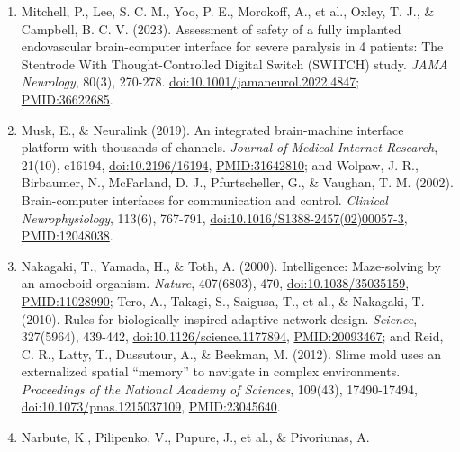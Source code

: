 \documentclass[10pt,letterpaper]{article}
\begin{document}
\begin{enumerate}
  \emph{Annual Review of Microbiology}, 55, 165-199,
  \href{https://doi.org/10.1146/annurev.micro.55.1.165}{doi:10.1146/annurev.micro.55.1.165},
  \url{PMID:11544353}; and Schuster, M., Lostroh, C. P., Ogi, T., \&
  Greenberg, E. P. (2003). Identification, timing, and signal
  specificity of \emph{Pseudomonas aeruginosa} quorum-controlled genes:
  a transcriptome analysis. \emph{Journal of Bacteriology}, 185(7),
  2066-2079,
  \href{https://doi.org/10.1128/JB.185.7.2066-2079.2003}{doi:10.1128/JB.185.7.2066-2079.2003},
  \url{PMID:12644476}.
\item
  Mitchell, P., Lee, S. C. M., Yoo, P. E., Morokoff, A., et al., Oxley,
  T. J., \& Campbell, B. C. V. (2023). Assessment of safety of a fully
  implanted endovascular brain-computer interface for severe paralysis
  in 4 patients: The Stentrode With Thought-Controlled Digital Switch
  (SWITCH) study. \emph{JAMA Neurology}, 80(3), 270-278.
  \href{https://doi.org/10.1001/jamaneurol.2022.4847}{doi:10.1001/jamaneurol.2022.4847};
  \url{PMID:36622685}.
\item
  Musk, E., \& Neuralink (2019). An integrated brain-machine interface
  platform with thousands of channels. \emph{Journal of Medical Internet
  Research}, 21(10), e16194,
  \href{https://doi.org/10.2196/16194}{doi:10.2196/16194},
  \url{PMID:31642810}; and Wolpaw, J. R., Birbaumer, N., McFarland, D.
  J., Pfurtscheller, G., \& Vaughan, T. M. (2002). Brain-computer
  interfaces for communication and control. \emph{Clinical
  Neurophysiology}, 113(6), 767-791,
  \href{https://doi.org/10.1016/S1388-2457(02)00057-3}{doi:10.1016/S1388-2457(02)00057-3},
  \url{PMID:12048038}.
\item
  Nakagaki, T., Yamada, H., \& Toth, A. (2000). Intelligence:
  Maze-solving by an amoeboid organism. \emph{Nature}, 407(6803), 470,
  \href{https://doi.org/10.1038/35035159}{doi:10.1038/35035159},
  \url{PMID:11028990}; Tero, A., Takagi, S., Saigusa, T., et al., \&
  Nakagaki, T. (2010). Rules for biologically inspired adaptive network
  design. \emph{Science}, 327(5964), 439-442,
  \href{https://doi.org/10.1126/science.1177894}{doi:10.1126/science.1177894},
  \url{PMID:20093467}; and Reid, C. R., Latty, T., Dussutour, A., \&
  Beekman, M. (2012). Slime mold uses an externalized spatial ``memory''
  to navigate in complex environments. \emph{Proceedings of the National
  Academy of Sciences}, 109(43), 17490-17494,
  \href{https://doi.org/10.1073/pnas.1215037109}{doi:10.1073/pnas.1215037109},
  \url{PMID:23045640}.
\item
  Narbute, K., Pilipenko, V., Pupure, J., et al., \& Pivoriunas, A.

\end{enumerate}
\end{document}
